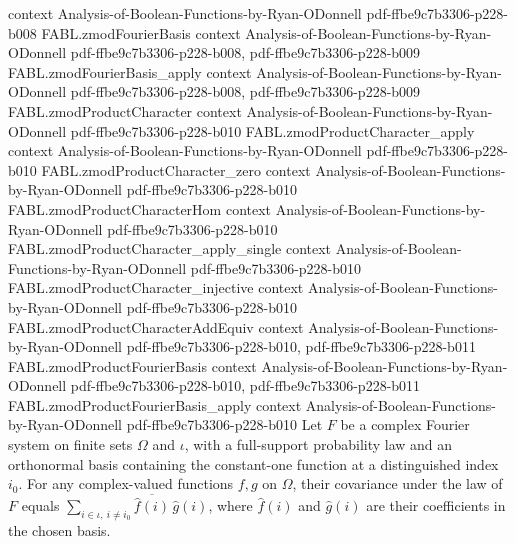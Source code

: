 \begin{theorem}
  {context}
  {Analysis-of-Boolean-Functions-by-Ryan-ODonnell}
  {pdf-ffbe9c7b3306-p228-b008}
\proofstep
  {FABL.zmodFourierBasis}
  {context}
  {Analysis-of-Boolean-Functions-by-Ryan-ODonnell}
  {pdf-ffbe9c7b3306-p228-b008,
    pdf-ffbe9c7b3306-p228-b009}
\proofstep
  {FABL.zmodFourierBasis_apply}
  {context}
  {Analysis-of-Boolean-Functions-by-Ryan-ODonnell}
  {pdf-ffbe9c7b3306-p228-b008,
    pdf-ffbe9c7b3306-p228-b009}
\proofstep
  {FABL.zmodProductCharacter}
  {context}
  {Analysis-of-Boolean-Functions-by-Ryan-ODonnell}
  {pdf-ffbe9c7b3306-p228-b010}
\proofstep
  {FABL.zmodProductCharacter_apply}
  {context}
  {Analysis-of-Boolean-Functions-by-Ryan-ODonnell}
  {pdf-ffbe9c7b3306-p228-b010}
\proofstep
  {FABL.zmodProductCharacter_zero}
  {context}
  {Analysis-of-Boolean-Functions-by-Ryan-ODonnell}
  {pdf-ffbe9c7b3306-p228-b010}
\proofstep
  {FABL.zmodProductCharacterHom}
  {context}
  {Analysis-of-Boolean-Functions-by-Ryan-ODonnell}
  {pdf-ffbe9c7b3306-p228-b010}
\proofstep
  {FABL.zmodProductCharacter_apply_single}
  {context}
  {Analysis-of-Boolean-Functions-by-Ryan-ODonnell}
  {pdf-ffbe9c7b3306-p228-b010}
\proofstep
  {FABL.zmodProductCharacter_injective}
  {context}
  {Analysis-of-Boolean-Functions-by-Ryan-ODonnell}
  {pdf-ffbe9c7b3306-p228-b010}
\proofstep
  {FABL.zmodProductCharacterAddEquiv}
  {context}
  {Analysis-of-Boolean-Functions-by-Ryan-ODonnell}
  {pdf-ffbe9c7b3306-p228-b010,
    pdf-ffbe9c7b3306-p228-b011}
\proofstep
  {FABL.zmodProductFourierBasis}
  {context}
  {Analysis-of-Boolean-Functions-by-Ryan-ODonnell}
  {pdf-ffbe9c7b3306-p228-b010,
    pdf-ffbe9c7b3306-p228-b011}
\proofstep
  {FABL.zmodProductFourierBasis_apply}
  {context}
  {Analysis-of-Boolean-Functions-by-Ryan-ODonnell}
  {pdf-ffbe9c7b3306-p228-b010}
Let $F$ be a complex Fourier system on finite sets $Ω$ and $ι$, with a full-support
probability law and an orthonormal basis containing the constant-one function at a
distinguished index $i_0$. For any complex-valued functions $f,g$ on $Ω$, their
covariance under the law of $F$ equals $\sum_{i\in ι,\ i\ne i_0}\overline{\widehat
f(i)}\,\widehat g(i)$, where $\widehat f(i)$ and $\widehat g(i)$ are their coefficients
in the chosen basis.
\end{theorem}


